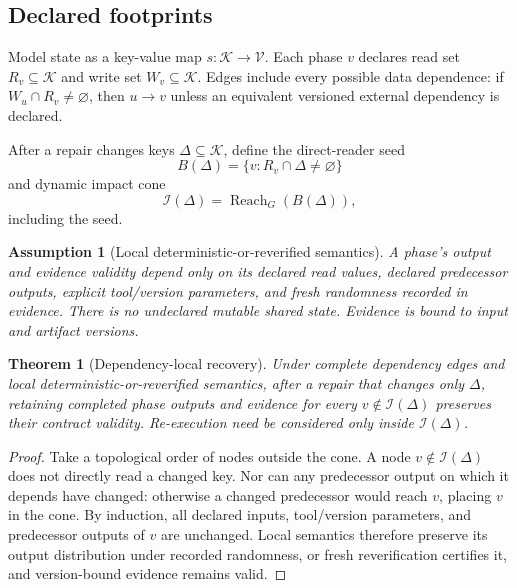 \documentclass[11pt]{article}
\newtheorem{assumption}[definition]{Assumption}
\newtheorem{theorem}[definition]{Theorem}
\newcommand{\Keys}{\mathcal K}
\newcommand{\Reach}{\operatorname{Reach}}
\begin{document}
\subsection{Declared footprints}
Model state as a key-value map $s:\Keys\to\mathcal V$. Each phase $v$ declares read set $R_v\subseteq\Keys$ and write set $W_v\subseteq\Keys$. Edges include every possible data dependence: if $W_u\cap R_v\neq\varnothing$, then $u\to v$ unless an equivalent versioned external dependency is declared.

After a repair changes keys $\Delta\subseteq\Keys$, define the direct-reader seed
\[
B(\Delta)=\{v:R_v\cap\Delta\neq\varnothing\}
\]
and dynamic impact cone
\[
\mathcal I(\Delta)=\Reach_G(B(\Delta)),
\]
including the seed.

\begin{assumption}[Local deterministic-or-reverified semantics]
A phase's output and evidence validity depend only on its declared read values, declared predecessor outputs, explicit tool/version parameters, and fresh randomness recorded in evidence. There is no undeclared mutable shared state. Evidence is bound to input and artifact versions.
\end{assumption}

\begin{theorem}[Dependency-local recovery]
\label{thm:local}
Under complete dependency edges and local deterministic-or-reverified semantics, after a repair that changes only $\Delta$, retaining completed phase outputs and evidence for every $v\notin\mathcal I(\Delta)$ preserves their contract validity. Re-execution need be considered only inside $\mathcal I(\Delta)$.
\end{theorem}
\begin{proof}
Take a topological order of nodes outside the cone. A node $v\notin\mathcal I(\Delta)$ does not directly read a changed key. Nor can any predecessor output on which it depends have changed: otherwise a changed predecessor would reach $v$, placing $v$ in the cone. By induction, all declared inputs, tool/version parameters, and predecessor outputs of $v$ are unchanged. Local semantics therefore preserve its output distribution under recorded randomness, or fresh reverification certifies it, and version-bound evidence remains valid.
\end{proof}
\end{document}
